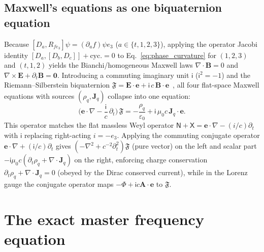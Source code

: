 \documentclass[aps,prd,onecolumn,tightenlines,nofootinbib,notitlepage,10pt,floatfix]{revtex4-2}
\theoremstyle{indentedtheorem}
\begin{document}
\subsection{Maxwell's equations as one biquaternion equation}
\label{sec:maxwell}

Because $[D_a, R_{f e_3}]\psi=(\partial_a f)\psi e_3$ ($a\in\{t,1,2,3\}$), applying the operator Jacobi identity $[D_a,[D_b,D_c]]+\text{cyc.}=0$ to Eq.~\eqref{eq:phase_curvature} for $(1,2,3)$ and $(t,1,2)$ yields the Bianchi/homogeneous Maxwell laws $\nabla\cdot\mathbf{B}=0$ and $\nabla\times\mathbf{E}+\partial_t\mathbf{B}=\mathbf{0}$. Introducing a commuting imaginary unit $\mathsf{i}$ ($\mathsf{i}^2=-1$) and the Riemann--Silberstein biquaternion $\mathfrak{F}=\mathbf{E}\cdot\mathbf{e}+\mathsf{i}\,c\,\mathbf{B}\cdot\mathbf{e}$~\citep{Silberstein1907Elektromagnetische,Silberstein1912Quaternionic,BialynickiBirula1996Photon}, all four flat-space Maxwell equations with sources $(\rho_q,\mathbf{J}_q)$ collapse into one equation:
\begin{equation}
    \Big(\mathbf{e}\cdot\nabla-\frac{\mathsf{i}}{c}\,\partial_t\Big)\,\mathfrak{F} = -\frac{\rho_q}{\varepsilon_0} + \mathsf{i}\,\mu_0 c\,\mathbf{J}_q\cdot\mathbf{e} .
    \label{eq:maxwell_biquaternion}
\end{equation}
This operator matches the flat massless Weyl operator $\mathsf{N}+\mathsf{X}=\mathbf{e}\cdot\nabla-(i/c)\partial_t$ with $\mathsf{i}$ replacing right-acting $i=-e_3$. Applying the commuting conjugate operator $\mathbf{e}\cdot\nabla+(\mathsf{i}/c)\partial_t$ gives $(-\nabla^2+c^{-2}\partial_t^2)\mathfrak{F}$ (pure vector) on the left and scalar part $-\mathsf{i}\mu_0 c(\partial_t\rho_q+\nabla\cdot\mathbf{J}_q)$ on the right, enforcing charge conservation $\partial_t\rho_q+\nabla\cdot\mathbf{J}_q=0$ (obeyed by the Dirac conserved current), while in the Lorenz gauge the conjugate operator maps $-\Phi+\mathsf{i}c\mathbf{A}\cdot\mathbf{e}$ to $\mathfrak{F}$.

\section{The exact master frequency equation}
\label{sec:master}
\end{document}
